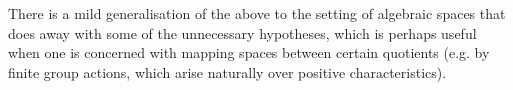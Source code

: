         There is a mild generalisation of the above to the setting of algebraic spaces that does away with some of the unnecessary hypotheses, which is perhaps useful when one is concerned with mapping spaces between certain quotients (e.g. by finite group actions, which arise naturally over positive characteristics).
        \begin{proposition}
            
        \end{proposition}